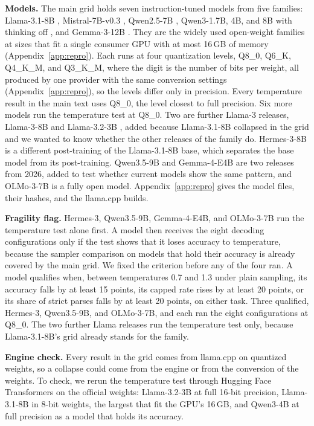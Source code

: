 \documentclass[10pt]{article}
\begin{document}
\textbf{Models.} The main grid holds seven instruction-tuned models from five families:
Llama-3.1-8B \citep{grattafiori2024llama}, Mistral-7B-v0.3 \citep{jiang2023mistral}, Qwen2.5-7B
\citep{yang2024qwen25}, Qwen3-1.7B, 4B, and 8B with thinking off \citep{yang2025qwen3}, and
Gemma-3-12B \citep{gemma2025gemma3}. They are the widely used open-weight families at sizes that
fit a single consumer GPU with at most 16\,GB of memory (Appendix~\ref{app:repro}). Each
runs at four quantization levels, Q8\_0, Q6\_K, Q4\_K\_M, and Q3\_K\_M, where the digit is the
number of bits per weight, all produced by one provider with the same conversion settings
(Appendix~\ref{app:repro}), so the levels differ only in precision. Every temperature result in
the main text uses Q8\_0, the level closest to full precision. Six more models run the temperature
test at Q8\_0. Two are further Llama-3 releases, Llama-3-8B \citep{meta2024llama3} and
Llama-3.2-3B \citep{meta2024llama32}, added because Llama-3.1-8B collapsed in the grid and we
wanted to know whether the other releases of the family do. Hermes-3-8B \citep{teknium2024hermes3}
is a different post-training of the Llama-3.1-8B base, which separates the base model from its
post-training. Qwen3.5-9B \citep{qwen2026qwen35} and Gemma-4-E4B \citep{google2026gemma4} are
two releases from 2026, added to test whether current models show the same pattern, and
OLMo-3-7B \citep{ai2025olmo3} is a fully open model. Appendix~\ref{app:repro} gives the model
files, their hashes, and the llama.cpp builds.

\textbf{Fragility flag.} Hermes-3, Qwen3.5-9B, Gemma-4-E4B, and OLMo-3-7B run the temperature
test alone first. A model then receives the eight decoding configurations only if the test shows
that it loses accuracy to temperature, because the sampler comparison on models that hold their
accuracy is already covered by the main grid. We fixed the criterion before any of the four ran.
A model qualifies when, between temperatures 0.7 and 1.3 under plain sampling, its accuracy
falls by at least 15 points, its capped rate rises by at least 20 points, or its share of strict
parses falls by at least 20 points, on either task. Three qualified, Hermes-3, Qwen3.5-9B, and
OLMo-3-7B, and each ran the eight configurations at Q8\_0. The two further Llama releases run
the temperature test only, because Llama-3.1-8B's grid already stands for the family.

\textbf{Engine check.} Every result in the grid comes from llama.cpp on quantized weights, so a
collapse could come from the engine or from the conversion of the weights. To check, we rerun
the temperature test through Hugging Face Transformers \citep{wolf2020transformers} on the
official weights: Llama-3.2-3B at full 16-bit precision, Llama-3.1-8B in 8-bit weights, the
largest that fit the GPU's 16\,GB, and Qwen3-4B at full precision as a model that holds its accuracy.
\end{document}

